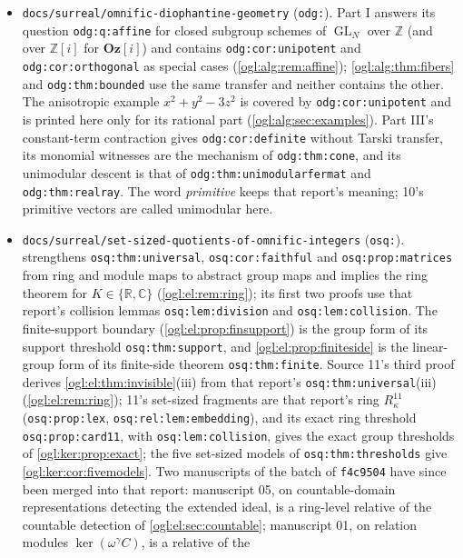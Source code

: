 \documentclass[11pt,oneside]{article}
\numberwithin{equation}{section}
\theoremstyle{definition}
\theoremstyle{remark}
\newcommand{\GOz}{\mathbf{Oz}[i]}
\newcommand{\Z}{\mathbb Z}
\newcommand{\R}{\mathbb R}
\newcommand{\C}{\mathbb C}
\newcommand{\GL}{\operatorname{GL}}
\newcommand{\replabel}[1]{\nolinkurl{#1}}
\newcommand{\fn}[1]{\nolinkurl{#1}}
\begin{document}
\begin{itemize}[leftmargin=*]
\item \fn{docs/surreal/omnific-diophantine-geometry} (\texttt{odg:}). Part I
answers its question \replabel{odg:q:affine} for closed subgroup schemes of
$\GL_N$ over $\Z$ (and over $\Z[i]$ for $\GOz$) and contains
\replabel{odg:cor:unipotent} and \replabel{odg:cor:orthogonal} as special cases
(\cref{ogl:alg:rem:affine}); \cref{ogl:alg:thm:fibers} and
\replabel{odg:thm:bounded} use the same transfer and neither contains the other.
The anisotropic example $x^2+y^2-3z^2$ is covered by
\replabel{odg:cor:unipotent} and is printed here only for its rational part
(\cref{ogl:alg:sec:examples}). Part III's constant-term contraction gives
\replabel{odg:cor:definite} without Tarski transfer, its monomial witnesses are
the mechanism of \replabel{odg:thm:cone}, and its unimodular descent is that of
\replabel{odg:thm:unimodularfermat} and \replabel{odg:thm:realray}. The word
\emph{primitive} keeps that report's meaning; 10's primitive vectors are called
unimodular here.
\item \fn{docs/surreal/set-sized-quotients-of-omnific-integers} (\texttt{osq:}).
 strengthens \replabel{osq:thm:universal},
\replabel{osq:cor:faithful} and \replabel{osq:prop:matrices} from ring and module
maps to abstract group maps and implies the ring theorem for $K\in\{\R,\C\}$
(\cref{ogl:el:rem:ring}); its first two proofs use that report's collision lemmas
\replabel{osq:lem:division} and \replabel{osq:lem:collision}. The finite-support
boundary (\cref{ogl:el:prop:finsupport}) is the group form of its support
threshold \replabel{osq:thm:support}, and \cref{ogl:el:prop:finiteside} is the
linear-group form of its finite-side theorem \replabel{osq:thm:finite}.
Source 11's third proof derives \cref{ogl:el:thm:invisible}(iii) from that
report's \replabel{osq:thm:universal}(iii) (\cref{ogl:el:rem:ring}); 11's
set-sized fragments are that report's ring $R^{11}_\kappa$
(\replabel{osq:prop:lex}, \replabel{osq:rel:lem:embedding}), and its exact ring
threshold \replabel{osq:prop:card11}, with \replabel{osq:lem:collision}, gives
the exact group thresholds of \cref{ogl:ker:prop:exact}; the five set-sized
models of \replabel{osq:thm:thresholds} give \cref{ogl:ker:cor:fivemodels}. Two
manuscripts of the batch of \texttt{f4c9504} have since been merged into that
report: manuscript 05,
on countable-domain representations detecting the extended ideal, is a
ring-level relative of the countable detection of \cref{ogl:el:sec:countable};
manuscript 01, on relation modules $\ker(\omega^\gamma C)$, is a relative of the

\end{itemize}
\end{document}
